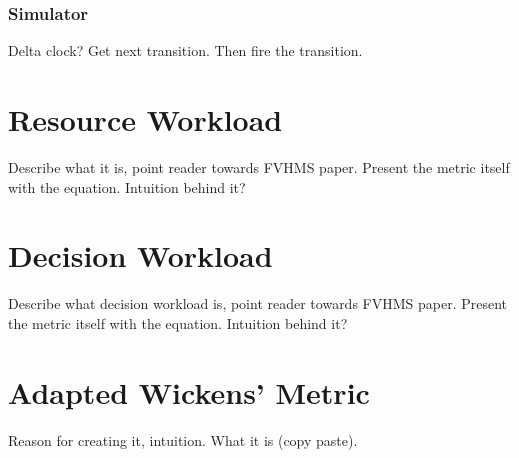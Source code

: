 \subsubsection{Simulator}
Delta clock?  Get next transition.  Then fire the transition.

\section{Resource Workload}
Describe what it is, point reader towards FVHMS paper.  Present the metric itself with the equation.
Intuition behind it?

\section{Decision Workload}
Describe what decision workload is, point reader towards FVHMS paper.  Present the metric itself with the equation.
Intuition behind it?

\section{Adapted Wickens' Metric}
Reason for creating it, intuition.  What it is (copy paste).